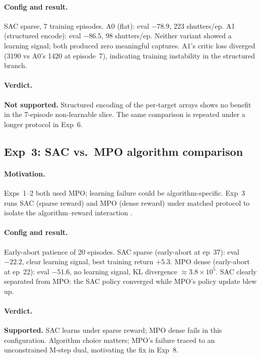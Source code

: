 \paragraph{Config and result.}
SAC sparse, 7 training episodes.
A0 (flat): eval $-78.9$, 223 shutters/ep.
A1 (structured encode): eval $-86.5$, 98 shutters/ep.
Neither variant showed a learning signal; both produced zero meaningful captures.
A1's critic loss diverged (3190 vs A0's 1420 at episode~7), indicating training instability in the structured branch.

\paragraph{Verdict.}
\textbf{Not supported.}
Structured encoding of the per-target arrays shows no benefit in the 7-episode non-learnable slice.
The same comparison is repeated under a longer protocol in Exp~6.

\subsection{Exp~3: SAC vs.\ MPO algorithm comparison}
\label{sec:exp3}

\paragraph{Motivation.}
Exps~1--2 both used MPO; learning failure could be algorithm-specific.
Exp~3 runs SAC (sparse reward) and MPO (dense reward) under matched protocol to isolate the
algorithm--reward interaction \citep{haarnoja2018sac,abdolmaleki2018mpo}.

\paragraph{Config and result.}
Early-abort patience of 20 episodes.
SAC sparse (early-abort at ep~37): eval $-22.2$, clear learning signal, best training return $+5.3$.
MPO dense (early-abort at ep~22): eval $-51.6$, no learning signal, KL divergence $\approx 3.8\times10^5$.
SAC clearly separated from MPO: the SAC policy converged while MPO's policy update blew up.

\paragraph{Verdict.}
\textbf{Supported.}
SAC learns under sparse reward; MPO dense fails in this configuration.
Algorithm choice matters; MPO's failure traced to an unconstrained M-step dual, motivating the fix in Exp~8.

